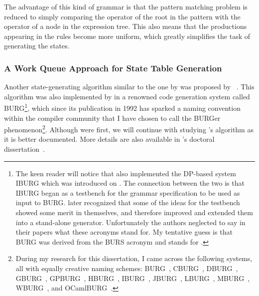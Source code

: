 {The advantage of this kind of \gls{grammar} is that the \gls{pattern matching}
problem is reduced to simply comparing the operator of the \gls{root} in the
\gls{pattern} with the operator of a \gls{node} in the \gls{expression tree}.
%
This
also means that the \glspl{production} appearing in the \glspl{rule} become more
uniform, which greatly simplifies the task of generating the \glspl{state}.


\subsubsection{A Work Queue Approach for State Table Generation}

Another \gls{state}-generating algorithm similar to the one by
\citeauthor{Balachandran1990} was proposed by
\citeauthor{Proebsting1992b}~\cite{Proebsting1992b, Proebsting1995a}.
%
This
algorithm was also implemented by \textcite{Fraser1992b} in a renowned \gls{code
  generation} system called \gls{BURG}\footnote{The keen reader will notice that
  \citeauthor{Fraser1992a} also implemented the \gls{DP}-based system
  \gls{IBURG} which was introduced on .
%
The connection between
  the two is that \gls{IBURG} began as a testbench for the \gls{grammar}
  specification to be used as input to \gls{BURG}.
%
\citeauthor{Fraser1992b}
  later recognized that some of the ideas for the testbench showed some merit in
  themselves, and therefore improved and extended them into a stand-alone
  generator.
%
Unfortunately the authors neglected to say in their papers what
  these acronyms stand for.
%
My tentative guess is that \gls{BURG} was derived
  from the \gls{BURS} acronym and stands for .}, which since its publication in 1992 has sparked a naming
convention within the \gls{compiler} community that I have chosen to call the
\gls{BURGer phenomenon}\footnote{During my research for this dissertation, I came across
  the following systems, all with equally creative naming schemes:
  \gls{BURG}~\cite{Fraser1992b}, \gls{CBURG}~\cite{Scharwaechter2007},
  \gls{DBURG}~\cite{Ertl1999}, \gls{GBURG}~\cite{Fraser1999},
  \gls{GPBURG}~\cite{Gough2012}, \gls{HBURG}~\cite{HBURG},
  \gls{IBURG}~\cite{Fraser1992a}, \gls{JBURG}~\cite{JBURG},
  \gls{LBURG}~\cite{Hanson1995}, \gls{MBURG}~\cite{Gough1995, Gough1997},
  \gls{WBURG}~\cite{Proebsting1996}, and \gls{OCamlBURG}~\cite{OCamlBURG}.}.
Although \citeauthor{Balachandran1990} were first, we will continue with
studying \citeauthor{Proebsting1992b}'s algorithm as it is better
documented.
%
More details are also available in \citeauthor{Proebsting1992a}'s
doctoral dissertation~\cite{Proebsting1992a}.

}
